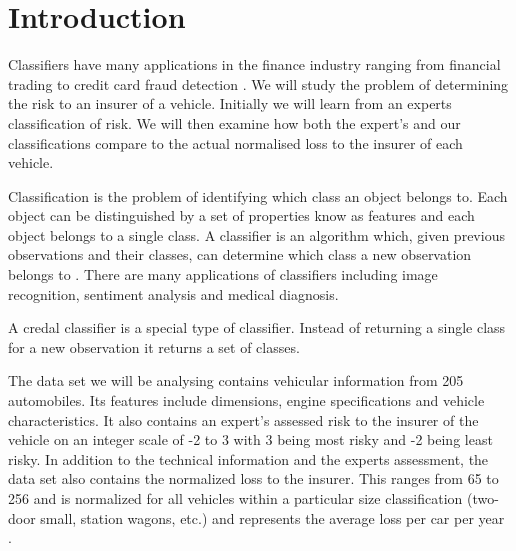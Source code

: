 \chapter{Introduction}

Classifiers have many applications in the finance industry ranging from financial trading \cite{Gerlein16} to credit card fraud detection \cite{Pozzolo15}.
We will study the problem of determining the risk to an insurer of a vehicle.
Initially we will learn from an experts classification of risk.
We will then examine how both the expert's and our classifications compare to the actual normalised loss to the insurer of each vehicle.

Classification is the problem of identifying which class an object belongs to.
Each object can be distinguished by a set of properties know as features and each object belongs to a single class.
A classifier is an algorithm which, given previous observations and their classes, can determine which class a new observation belongs to \cite{Theodoridis03}.
There are many applications of classifiers including image recognition, sentiment analysis and medical diagnosis.

A credal classifier is a special type of classifier.
Instead of returning a single class for a new observation it returns a set of classes.

The data set we will be analysing contains vehicular information from 205 automobiles.
Its features include dimensions, engine specifications and vehicle characteristics.
It also contains an expert's assessed risk to the insurer of the vehicle on an integer scale of -2 to 3 with 3 being most risky and -2 being least risky.
In addition to the technical information and the experts assessment, the data set also contains the normalized loss to the insurer.
This ranges from 65 to 256 and is normalized for all vehicles within a particular size classification (two-door small, station wagons, etc.) and represents the average loss per car per year \cite{Automobile}.